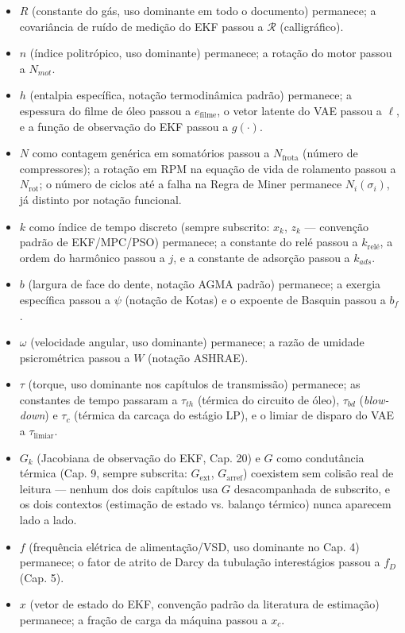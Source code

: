\documentclass[12pt,a4paper]{article}
\numberwithin{equation}{section}
\numberwithin{table}{section}
\numberwithin{figure}{section}
\begin{document}
\begin{itemize}
	\item $R$ (constante do gás, uso dominante em todo o documento) permanece; a covariância de ruído de medição do EKF passou a $\mathcal{R}$ (calligráfico).
	\item $n$ (índice politrópico, uso dominante) permanece; a rotação do motor passou a $N_{mot}$.
	\item $h$ (entalpia específica, notação termodinâmica padrão) permanece; a espessura do filme de óleo passou a $e_{\text{filme}}$, o vetor latente do VAE passou a $\ell$, e a função de observação do EKF passou a $g(\cdot)$.
	\item $N$ como contagem genérica em somatórios passou a $N_{\text{frota}}$ (número de compressores); a rotação em RPM na equação de vida de rolamento passou a $N_{\text{rot}}$; o número de ciclos até a falha na Regra de Miner permanece $N_i(\sigma_i)$, já distinto por notação funcional.
	\item $k$ como índice de tempo discreto (sempre subscrito: $x_k$, $z_k$ — convenção padrão de EKF/MPC/PSO) permanece; a constante do relé passou a $k_{\text{relé}}$, a ordem do harmônico passou a $j$, e a constante de adsorção passou a $k_{ads}$.
	\item $b$ (largura de face do dente, notação AGMA padrão) permanece; a exergia específica passou a $\psi$ (notação de Kotas) e o expoente de Basquin passou a $b_f$.
	\item $\omega$ (velocidade angular, uso dominante) permanece; a razão de umidade psicrométrica passou a $W$ (notação ASHRAE).
	\item $\tau$ (torque, uso dominante nos capítulos de transmissão) permanece; as constantes de tempo passaram a $\tau_{th}$ (térmica do circuito de óleo), $\tau_{bd}$ (\textit{blow-down}) e $\tau_c$ (térmica da carcaça do estágio LP), e o limiar de disparo do VAE a $\tau_{\text{limiar}}$.
	\item $G_k$ (Jacobiana de observação do EKF, Cap. 20) e $G$ como condutância térmica (Cap. 9, sempre subscrita: $G_{\text{ext}}$, $G_{\text{arref}}$) coexistem sem colisão real de leitura — nenhum dos dois capítulos usa $G$ desacompanhada de subscrito, e os dois contextos (estimação de estado vs. balanço térmico) nunca aparecem lado a lado.
	\item $f$ (frequência elétrica de alimentação/VSD, uso dominante no Cap. 4) permanece; o fator de atrito de Darcy da tubulação interestágios passou a $f_D$ (Cap. 5).
	\item $x$ (vetor de estado do EKF, convenção padrão da literatura de estimação) permanece; a fração de carga da máquina passou a $x_c$.

\end{itemize}
\end{document}
